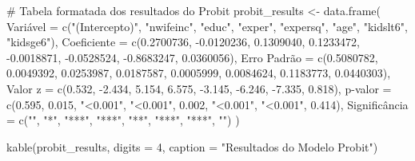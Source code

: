 \documentclass[
  letterpaper,
  DIV=11,
  numbers=noendperiod]{scrartcl}
\newenvironment{Shaded}{\begin{snugshade}}{\end{snugshade}}
\newcommand{\AttributeTok}[1]{\textcolor[rgb]{0.40,0.45,0.13}{#1}}
\newcommand{\CommentTok}[1]{\textcolor[rgb]{0.37,0.37,0.37}{#1}}
\newcommand{\DecValTok}[1]{\textcolor[rgb]{0.68,0.00,0.00}{#1}}
\newcommand{\FloatTok}[1]{\textcolor[rgb]{0.68,0.00,0.00}{#1}}
\newcommand{\FunctionTok}[1]{\textcolor[rgb]{0.28,0.35,0.67}{#1}}
\newcommand{\NormalTok}[1]{\textcolor[rgb]{0.00,0.23,0.31}{#1}}
\newcommand{\OtherTok}[1]{\textcolor[rgb]{0.00,0.23,0.31}{#1}}
\newcommand{\SpecialCharTok}[1]{\textcolor[rgb]{0.37,0.37,0.37}{#1}}
\newcommand{\StringTok}[1]{\textcolor[rgb]{0.13,0.47,0.30}{#1}}
\begin{document}
\begin{Shaded}
\begin{Highlighting}[]
\CommentTok{\# Tabela formatada dos resultados do Probit}
\NormalTok{probit\_results }\OtherTok{\textless{}{-}} \FunctionTok{data.frame}\NormalTok{(}
\NormalTok{  Variável }\OtherTok{=} \FunctionTok{c}\NormalTok{(}\StringTok{"(Intercepto)"}\NormalTok{, }\StringTok{"nwifeinc"}\NormalTok{, }\StringTok{"educ"}\NormalTok{, }\StringTok{"exper"}\NormalTok{, }\StringTok{"expersq"}\NormalTok{, }\StringTok{"age"}\NormalTok{, }\StringTok{"kidslt6"}\NormalTok{, }\StringTok{"kidsge6"}\NormalTok{),}
  \AttributeTok{Coeficiente =} \FunctionTok{c}\NormalTok{(}\FloatTok{0.2700736}\NormalTok{, }\SpecialCharTok{{-}}\FloatTok{0.0120236}\NormalTok{, }\FloatTok{0.1309040}\NormalTok{, }\FloatTok{0.1233472}\NormalTok{, }\SpecialCharTok{{-}}\FloatTok{0.0018871}\NormalTok{, }\SpecialCharTok{{-}}\FloatTok{0.0528524}\NormalTok{, }\SpecialCharTok{{-}}\FloatTok{0.8683247}\NormalTok{, }\FloatTok{0.0360056}\NormalTok{),}
  \StringTok{\textasciigrave{}}\AttributeTok{Erro Padrão}\StringTok{\textasciigrave{}} \OtherTok{=} \FunctionTok{c}\NormalTok{(}\FloatTok{0.5080782}\NormalTok{, }\FloatTok{0.0049392}\NormalTok{, }\FloatTok{0.0253987}\NormalTok{, }\FloatTok{0.0187587}\NormalTok{, }\FloatTok{0.0005999}\NormalTok{, }\FloatTok{0.0084624}\NormalTok{, }\FloatTok{0.1183773}\NormalTok{, }\FloatTok{0.0440303}\NormalTok{),}
  \StringTok{\textasciigrave{}}\AttributeTok{Valor z}\StringTok{\textasciigrave{}} \OtherTok{=} \FunctionTok{c}\NormalTok{(}\FloatTok{0.532}\NormalTok{, }\SpecialCharTok{{-}}\FloatTok{2.434}\NormalTok{, }\FloatTok{5.154}\NormalTok{, }\FloatTok{6.575}\NormalTok{, }\SpecialCharTok{{-}}\FloatTok{3.145}\NormalTok{, }\SpecialCharTok{{-}}\FloatTok{6.246}\NormalTok{, }\SpecialCharTok{{-}}\FloatTok{7.335}\NormalTok{, }\FloatTok{0.818}\NormalTok{),}
  \StringTok{\textasciigrave{}}\AttributeTok{p{-}valor}\StringTok{\textasciigrave{}} \OtherTok{=} \FunctionTok{c}\NormalTok{(}\FloatTok{0.595}\NormalTok{, }\FloatTok{0.015}\NormalTok{, }\StringTok{"\textless{}0.001"}\NormalTok{, }\StringTok{"\textless{}0.001"}\NormalTok{, }\FloatTok{0.002}\NormalTok{, }\StringTok{"\textless{}0.001"}\NormalTok{, }\StringTok{"\textless{}0.001"}\NormalTok{, }\FloatTok{0.414}\NormalTok{),}
\NormalTok{  Significância }\OtherTok{=} \FunctionTok{c}\NormalTok{(}\StringTok{""}\NormalTok{, }\StringTok{"*"}\NormalTok{, }\StringTok{"***"}\NormalTok{, }\StringTok{"***"}\NormalTok{, }\StringTok{"**"}\NormalTok{, }\StringTok{"***"}\NormalTok{, }\StringTok{"***"}\NormalTok{, }\StringTok{""}\NormalTok{)}
\NormalTok{)}

\FunctionTok{kable}\NormalTok{(probit\_results, }\AttributeTok{digits =} \DecValTok{4}\NormalTok{, }\AttributeTok{caption =} \StringTok{"Resultados do Modelo Probit"}\NormalTok{)}
\end{Highlighting}
\end{Shaded}
\end{document}
